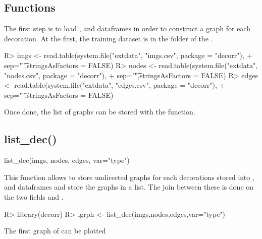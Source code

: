 \documentclass[article]{jss}
\begin{document}
\subsection{Functions} \label{sec:functions}

The first step is to load ,  and  dataframes in order to construct a graph for each decoration. At the first, the training dataset is in the  folder of the .

\begin{Schunk}
\begin{Sinput}
R> imgs <- read.table(system.file("extdata", "imgs.csv", package = "decorr"),
+                     sep="\t",stringsAsFactors = FALSE)
R> nodes <- read.table(system.file("extdata", "nodes.csv", package = "decorr"),
+                      sep="\t",stringsAsFactors = FALSE)
R> edges <- read.table(system.file("extdata", "edges.csv", package = "decorr"),
+                      sep="\t",stringsAsFactors = FALSE)
\end{Sinput}
\end{Schunk}

Once done, the list of graphs can be stored with the  function.

\subsection{list_dec()} \label{sec:fun_list_dec}

\begin{Code}
list_dec(imgs,
         nodes,
         edges,
         var="type")
\end{Code}

This function allows to store undirected graphs for each decorations stored into ,  and  dataframes and store the graphs in a list. The join between these  is done on the two fields  and .

\begin{Schunk}
\begin{Sinput}
R> library(decorr)
R> lgrph <- list_dec(imgs,nodes,edges,var="type")
\end{Sinput}
\end{Schunk}

The first graph of can be plotted
\end{document}

